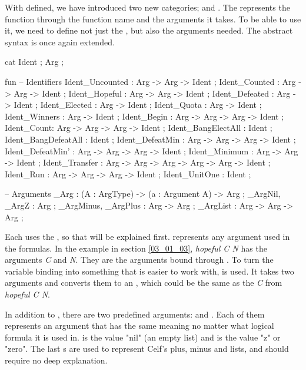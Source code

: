 With  defined, we have introduced two new categories;  and . The  represents the function through the function name and the arguments it takes. To be able to use it, we need to define not just the , but also the arguments needed. The abstract syntax is once again extended.

\begin{lstgf}
    cat
        Ident ; Arg ;

    fun
        -- Identifiers
        Ident_Uncounted : Arg -> Arg -> Ident ;
        Ident_Counted : Arg -> Arg -> Ident ;
        Ident_Hopeful : Arg -> Arg -> Ident ;
        Ident_Defeated : Arg -> Ident ;
        Ident_Elected : Arg -> Ident ;
        Ident_Quota : Arg -> Ident ;
        Ident_Winners : Arg -> Ident ;
        Ident_Begin : Arg -> Arg -> Arg -> Ident ;
        Ident_Count: Arg -> Arg -> Arg -> Ident ;
        Ident_BangElectAll : Ident ;
        Ident_BangDefeatAll : Ident ;
        Ident_DefeatMin : Arg -> Arg -> Arg -> Ident ;
        Ident_DefeatMin' : Arg -> Arg -> Arg -> Ident ;
        Ident_Minimum : Arg -> Arg -> Ident ;
        Ident_Transfer : Arg -> Arg -> Arg -> Arg -> Arg -> Ident ;
        Ident_Run : Arg -> Arg -> Arg -> Ident ;
        Ident_UnitOne : Ident ;

        -- Arguments
        _Arg : (A : ArgType) -> (a : Argument A) -> Arg ;
        _ArgNil, _ArgZ : Arg ;
        _ArgMinus, _ArgPlus : Arg -> Arg ;
        _ArgList : Arg -> Arg -> Arg ;
\end{lstgf}

Each  uses the , so that will be explained first.  represents any argument used in the formulas. In the example in section \ref{03_01_03}, \textit{hopeful C N} has the arguments \textit{C} and \textit{N}. They are the arguments bound through . To turn the variable binding into something that is easier to work with,  is used. It takes two arguments and converts them to an , which could be the same as the \textit{C} from \textit{hopeful C N}. 

In addition to , there are two predefined arguments:  and . Each of them represents an argument that has the same meaning no matter what logical formula it is used in.  is the value "nil" (an empty list) and  is the value "z" or "zero". The last s are used to represent Celf's plus, minus and lists, and should require no deep explanation. 

